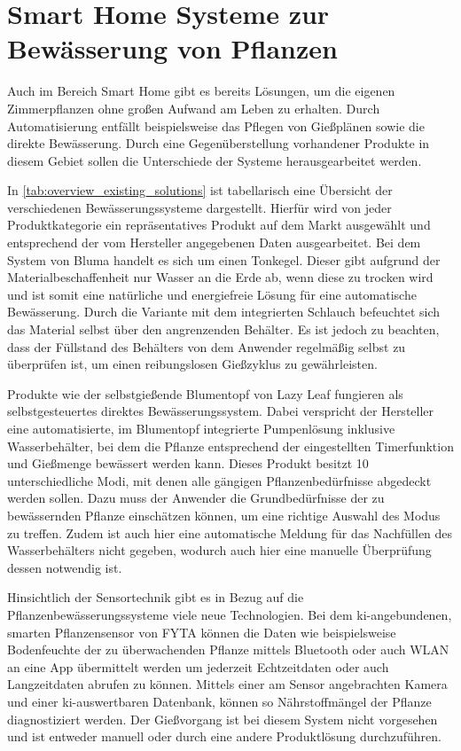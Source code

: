 \section{Smart Home Systeme zur Bewässerung von Pflanzen}
Auch im Bereich Smart Home gibt es bereits Lösungen, um die eigenen Zimmerpflanzen ohne großen Aufwand am Leben zu erhalten. Durch Automatisierung entfällt beispielsweise das Pflegen von Gießplänen sowie die direkte Bewässerung. Durch eine Gegenüberstellung vorhandener Produkte in diesem Gebiet sollen die Unterschiede der Systeme herausgearbeitet werden.

In \ref{tab:overview_existing_solutions} ist tabellarisch eine Übersicht der verschiedenen Bewässerungssysteme dargestellt. Hierfür wird von jeder Produktkategorie ein repräsentatives Produkt auf dem Markt ausgewählt und entsprechend der vom Hersteller angegebenen Daten ausgearbeitet. 
Bei dem System von Bluma handelt es sich um einen Tonkegel. Dieser gibt aufgrund der Materialbeschaffenheit nur Wasser an die Erde ab, wenn diese zu trocken wird und ist somit eine natürliche und energiefreie Lösung für eine automatische Bewässerung. Durch die Variante mit dem integrierten Schlauch befeuchtet sich das Material selbst über den angrenzenden Behälter. Es ist jedoch zu beachten, dass der Füllstand des Behälters von dem Anwender regelmäßig selbst zu überprüfen ist, um einen reibungslosen Gießzyklus zu gewährleisten. 

Produkte wie der selbstgießende Blumentopf von Lazy Leaf fungieren als selbstgesteuertes direktes Bewässerungssystem. Dabei verspricht der Hersteller eine automatisierte, im Blumentopf integrierte Pumpenlösung inklusive Wasserbehälter, bei dem die Pflanze entsprechend der eingestellten Timerfunktion und Gießmenge bewässert werden kann. Dieses Produkt besitzt 10 unterschiedliche Modi, mit denen alle gängigen Pflanzenbedürfnisse abgedeckt werden sollen. Dazu muss der Anwender die Grundbedürfnisse der zu bewässernden Pflanze einschätzen können, um eine richtige Auswahl des Modus zu treffen. Zudem ist auch hier eine automatische Meldung für das Nachfüllen des Wasserbehälters nicht gegeben, wodurch auch hier eine manuelle Überprüfung dessen notwendig ist.

Hinsichtlich der Sensortechnik gibt es in Bezug auf die Pflanzenbewässerungssysteme viele neue Technologien. Bei dem \ac{ki}-angebundenen, smarten Pflanzensensor von FYTA können die Daten wie beispielsweise Bodenfeuchte der zu überwachenden Pflanze mittels Bluetooth oder auch WLAN an eine App übermittelt werden um jederzeit Echtzeitdaten oder auch Langzeitdaten abrufen zu können. Mittels einer am Sensor angebrachten Kamera und einer \ac{ki}-auswertbaren Datenbank, können so Nährstoffmängel der Pflanze diagnostiziert werden. Der Gießvorgang ist bei diesem System nicht vorgesehen und ist entweder manuell oder durch eine andere Produktlösung durchzuführen.

